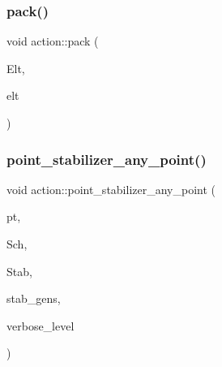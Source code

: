 \subsubsection{\texorpdfstring{pack()}{pack()}}
{\footnotesize\ttfamily void action\+::pack (\begin{DoxyParamCaption}\item[{void $\ast$}]{Elt,  }\item[{void $\ast$}]{elt }\end{DoxyParamCaption})}

\mbox{\label{classaction_a32ab18e3be9f4412d340ee94de405c13}} 
\subsubsection{\texorpdfstring{point\+\_\+stabilizer\+\_\+any\+\_\+point()}{point\_stabilizer\_any\_point()}}
{\footnotesize\ttfamily void action\+::point\+\_\+stabilizer\+\_\+any\+\_\+point (\begin{DoxyParamCaption}\item[{\mbox{\hyperlink{galois_8h_a09fddde158a3a20bd2dcadb609de11dc}{I\+NT}} \&}]{pt,  }\item[{\mbox{\hyperlink{classschreier}{schreier}} $\ast$\&}]{Sch,  }\item[{\mbox{\hyperlink{classsims}{sims}} $\ast$\&}]{Stab,  }\item[{\mbox{\hyperlink{classstrong__generators}{strong\+\_\+generators}} $\ast$\&}]{stab\+\_\+gens,  }\item[{\mbox{\hyperlink{galois_8h_a09fddde158a3a20bd2dcadb609de11dc}{I\+NT}}}]{verbose\+\_\+level }\end{DoxyParamCaption})}

\mbox{\label{classaction_a4892e0399ba1be9d5f0aae001f18d663}} 
